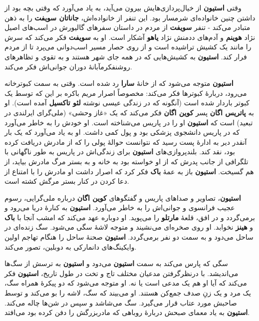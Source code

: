 \documentclass[12pt]{book}
\newcommand{\noun}[1]{{\textbf{#1}}}
\begin{document}
    وقتی \noun{استیون} از خیال‌پردازی‌هایش بیرون می‌آید، به یاد می‌آورد که وقتی بچه بود از داشتن چنین خانواده‌ای شرمسار بود. این تنفر از خانواده‌اش، \noun{جاناتان سویفت} را به ذهن متبادر می‌کند - تنفر \noun{سویفت} از مردم در داستان سفرهای گالیورش در اسب‌های اصیل نژاد \noun{هوینم} و آدم‌های ددمنش نژاد \noun{یاهو} آشکار است. او به \noun{سویفت} فکر می‌کند که سرش را مانند یک کشیش تراشیده است و از روی حصار مسیر اسب‌دوانی می‌پرد تا از مردم فرار کند. \noun{استیون} به کشیش‌هایی که در همه جای شهر هستند و به تقوی و تظاهرهای روشنفکرمآبانهٔ دوران جوانی‌اش فکر می‌کند.

    \noun{استیون} متوجه می‌شود که از خانهٔ \noun{سارا} رد شده است. وقتی به سمت کبوترخانه می‌رود، دربارهٔ کبوترها فکر می‌کند: مخصوصاً اصرار مریم باکره بر این که توسط یک کبوتر باردار شده است (آنگونه که در زندگی عیسی نوشته \noun{لئو تاکسیل} آمده است). او به \noun{پاتریس اگان} پسر \noun{کوین اگان} فکر می‌کند که یک «غاز وحشی» (ملی‌گرای ایرلندی در تبعید) است که \noun{استیون} او را در پاریس می‌شناخته است. او خودش را به خاطر می‌آورد که در پاریس دانشجوی پزشکی بود و پول کمی داشت. او به یاد می‌آورد که یک بار آنقدر دیر به ادارهٔ پست رسید که نتوانست حوالهٔ پولی را که از مادرش دریافت کرده بود، نقد کند. بلندپروازی‌های \noun{استیون} برای زندگی‌اش در پاریس به طور ناگهانی با تلگرافی از جانب پدرش که از او خواسته بود به خانه و به بستر مرگ مادرش بیاید، از هم گسیخت. \noun{استیون} باز به عمهٔ \noun{باک}  فکر کرد که اصرار داشت او مادرش را با امتناع از دعا کردن در کنار بستر مرگش کشته است.

    \noun{استیون}، تصاویر و صداهای پاریس و گفتگوهای \noun{کوین اگان} درباره ملی‌گرایی، رسوم عجیب فرانسوی و جوانی‌اش را به خاطر می‌آورد. \noun{استیون} به کنارهٔ دریا می‌رود و برمی‌گردد و در افق، قلعهٔ \noun{مارتلو} را می‌پوید. او دوباره عهد می‌کند که امشب آنجا با \noun{باک}  و \noun{هینز}  نخوابد. او روی صخره‌ای می‌نشیند و متوجه لاشهٔ سگی می‌شود. سگ زنده‌ای در ساحل می‌دود و به سمت دو نفر برمی‌گردد. \noun{استیون} صحنهٔ ساحل را هنگام تهاجم اولین وایکینگ‌های دانمارکی به دوبلین، تصور می‌کند.

    سگی که پارس می‌کند به سمت \noun{استیون} می‌دود و \noun{استیون} به ترسش از سگ‌ها می‌اندیشد. با درنظرگرفتن مدعیان مختلف تاج و تخت در طول تاریخ، \noun{استیون} فکر می‌کند که آیا او هم یک مدعی است یا نه. او متوجه می‌شود که دو پیکرهٔ همراه سگ، یک مرد و یک زنِ صدف جمع‌کن هستند. او می‌بیند که سگ، لاشه را بو می‌کند و توسط صاحبش مورد عتاب قرار می‌گیرد. سگ می‌شاشد و سپس در شن‌ها چاله می‌کند. \noun{استیون} به یاد معمای صبحش دربارهٔ روباهی که مادربزرگش را دفن کرده بود می‌افتد.
\end{document}
